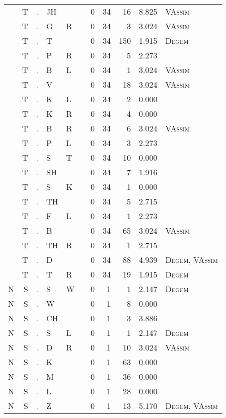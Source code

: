 \begin{longtable}{r@{ } r@{ } c@{ } l@{ } l@{ } l@{ } r r r r l }
 & T & . & JH &  &  & 0 & 34 & 16 & 8.825 & \textsc{VAssim} \\
 & T & . & G & R &  & 0 & 34 & 3 & 3.024 & \textsc{VAssim} \\
 & T & . & T &  &  & 0 & 34 & 150 & 1.915 & \textsc{Degem} \\
 & T & . & P & R &  & 0 & 34 & 5 & 2.273 &  \\
 & T & . & B & L &  & 0 & 34 & 1 & 3.024 & \textsc{VAssim} \\
 & T & . & V &  &  & 0 & 34 & 18 & 3.024 & \textsc{VAssim} \\
 & T & . & K & L &  & 0 & 34 & 2 & 0.000 &  \\
 & T & . & K & R &  & 0 & 34 & 4 & 0.000 &  \\
 & T & . & B & R &  & 0 & 34 & 6 & 3.024 & \textsc{VAssim} \\
 & T & . & P & L &  & 0 & 34 & 3 & 2.273 &  \\
 & T & . & S & T &  & 0 & 34 & 10 & 0.000 &  \\
 & T & . & SH &  &  & 0 & 34 & 7 & 1.916 &  \\
 & T & . & S & K &  & 0 & 34 & 1 & 0.000 &  \\
 & T & . & TH &  &  & 0 & 34 & 5 & 2.715 &  \\
 & T & . & F & L &  & 0 & 34 & 1 & 2.273 &  \\
 & T & . & B &  &  & 0 & 34 & 65 & 3.024 & \textsc{VAssim} \\
 & T & . & TH & R &  & 0 & 34 & 1 & 2.715 &  \\
 & T & . & D &  &  & 0 & 34 & 88 & 4.939 & \textsc{Degem}, \textsc{VAssim} \\
 & T & . & T & R &  & 0 & 34 & 19 & 1.915 & \textsc{Degem} \\
N & S & . & S & W &  & 0 & 1 & 1 & 2.147 & \textsc{Degem} \\
N & S & . & W &  &  & 0 & 1 & 8 & 0.000 &  \\
N & S & . & CH &  &  & 0 & 1 & 3 & 3.886 &  \\
N & S & . & S & L &  & 0 & 1 & 1 & 2.147 & \textsc{Degem} \\
N & S & . & D & R &  & 0 & 1 & 10 & 3.024 & \textsc{VAssim} \\
N & S & . & K &  &  & 0 & 1 & 63 & 0.000 &  \\
N & S & . & M &  &  & 0 & 1 & 36 & 0.000 &  \\
N & S & . & L &  &  & 0 & 1 & 28 & 0.000 &  \\
N & S & . & Z &  &  & 0 & 1 & 13 & 5.170 & \textsc{Degem}, \textsc{VAssim} \\

\end{longtable}
